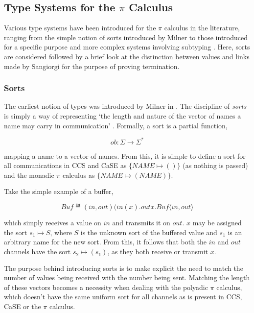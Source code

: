 \subsection{Type Systems for the $\pi$ Calculus}
\label{pitypes}

Various type systems have been introduced for the $\pi$ calculus in
the literature, ranging from the simple notion of sorts introduced by
Milner \cite{milner:pi} to those introduced for a specific purpose
\cite{sangiorgi:types-or} and more complex systems involving subtyping
\cite{sangiorgi:typing}.  Here, sorts are considered followed by a
brief look at the distinction between values and links made by
Sangiorgi \cite{sangiorgi:types-or} for the purpose of proving
termination.

\subsubsection{Sorts}

The earliest notion of types was introduced by Milner in
\cite{milner:93polyadic, milner:pi}.  The discipline of \emph{sorts}
is simply a way of representing `the length and nature of the vector
of names a name may carry in communication' \cite{milner:93polyadic}.
Formally, a sort is a partial function,

\begin{equation}
ob : \Sigma \rightarrow \Sigma^*
\end{equation}

\noindent mapping a name to a vector of names.  From this, it is
simple to define a sort for all communications in CCS and CaSE as
$\{NAME \mapsto ()\}$ (as nothing is passed) and the monadic $\pi$
calculus as $\{NAME \mapsto (NAME)\}$.

Take the simple example of a buffer,

\begin{equation}
  Buf \eqdef (in,out)(in(x).\overline{out}x.Buf\langle in,
  out\rangle 
\end{equation}

\noindent which simply receives a value on $in$ and transmits it on
$out$.  $x$ may be assigned the sort $s_1 \mapsto S$, where $S$ is the
unknown sort of the buffered value and $s_1$ is an arbitrary name for
the new sort.  From this, it follows that both the $in$ and $out$
channels have the sort $s_2 \mapsto (s_1)$, as they both receive or
transmit $x$.

The purpose behind introducing sorts is to make explicit the need to
match the number of values being received with the number being sent.
Matching the length of these vectors becomes a necessity when dealing
with the polyadic $\pi$ calculus, which doesn't have the same uniform
sort for all channels as is present in CCS, CaSE or the $\pi$
calculus.

